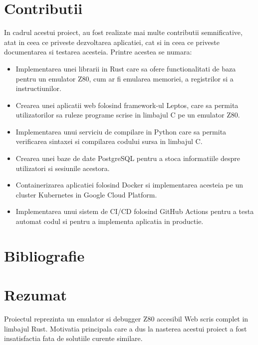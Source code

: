 \documentclass[titlepage,12pt]{article}
\begin{document}
\clearpage
\section{Contributii}
In cadrul acestui proiect, au fost realizate mai multe contributii semnificative, atat in ceea ce priveste dezvoltarea aplicatiei, cat si in ceea ce priveste documentarea si testarea acesteia. Printre acestea se numara:
\begin{itemize}
\item Implementarea unei librarii in Rust care sa ofere functionalitati de baza pentru un emulator Z80, cum ar fi emularea memoriei, a registrilor si a instructiunilor.
\item Crearea unei aplicatii web folosind framework-ul Leptos, care sa permita utilizatorilor sa ruleze programe scrise in limbajul C pe un emulator Z80.
\item Implementarea unui serviciu de compilare in Python care sa permita verificarea sintaxei si compilarea codului sursa in limbajul C.
\item Crearea unei baze de date PostgreSQL pentru a stoca informatiile despre utilizatori si sesiunile acestora.
\item Containerizarea aplicatiei folosind Docker si implementarea acesteia pe un cluster Kubernetes in Google Cloud Platform.
\item Implementarea unui sistem de CI/CD folosind GitHub Actions pentru a testa automat codul si pentru a implementa aplicatia in productie.
\end{itemize}

\clearpage
\section{Bibliografie}
\printbibliography

\clearpage
\pagestyle{empty}
\section*{Rezumat}
Proiectul reprezinta un emulator si debugger Z80 accesibil Web scris complet in limbajul Rust. Motivatia principala care a dus la nasterea acestui proiect a fost insatisfactia fata de solutiile curente similare.
\end{document}
